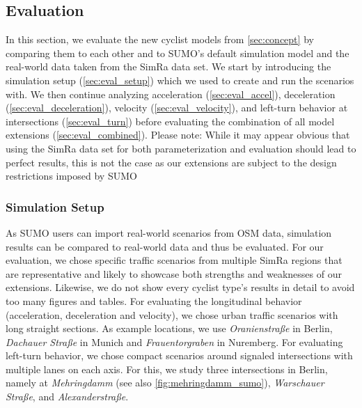 \subsection{Evaluation}
\label{subsec:evaluation_sumo}
In this section, we evaluate the new cyclist models from \cref{sec:concept} by comparing them to each other and to SUMO's default simulation model and the real-world data taken from the SimRa data set.
We start by introducing the simulation setup (\cref{sec:eval_setup}) which we used to create and run the scenarios with.
We then continue analyzing acceleration (\cref{sec:eval_accel}), deceleration (\cref{sec:eval_deceleration}), velocity (\cref{sec:eval_velocity}), and left-turn behavior at intersections (\cref{sec:eval_turn}) before evaluating the combination of all model extensions (\cref{sec:eval_combined}).
Please note: While it may appear obvious that using the SimRa data set for both parameterization and evaluation should lead to perfect results, this is not the case as our extensions are subject to the design restrictions imposed by SUMO

\subsubsection{Simulation Setup}
\label{subsubsec:simulation_setup}
As SUMO users can import real-world scenarios from OSM data, simulation results can be compared to real-world data and thus be evaluated.
For our evaluation, we chose specific traffic scenarios from multiple SimRa regions that are representative and likely to showcase both strengths and weaknesses of our extensions.
Likewise, we do not show every cyclist type's results in detail to avoid too many figures and tables.
For evaluating the longitudinal behavior (acceleration, deceleration and velocity), we chose urban traffic scenarios with long straight sections.
As example locations, we use \textit{Oranienstraße} in Berlin, \textit{Dachauer Straße} in Munich and \textit{Frauentorgraben} in Nuremberg.
For evaluating left-turn behavior, we chose compact scenarios around signaled intersections with multiple lanes on each axis.
For this, we study three intersections in Berlin, namely at \textit{Mehringdamm} (see also \cref{fig:mehringdamm_sumo}), \textit{Warschauer Straße}, and \textit{Alexanderstraße}.

